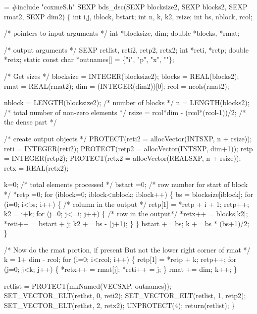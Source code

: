 \documentclass{article}
\begin{document}
\begin{nwchunk}
=
 #include "coxmeS.h"
 SEXP bds_dsc(SEXP blocksize2,  SEXP blocks2,  SEXP rmat2,
              SEXP dim2) \{
     int i,j, iblock, bstart;
     int n, k, k2, rsize;
     int bs, nblock, rcol;
     
     /* pointers to input arguments */
     int *blocksize, dim;
     double *blocks, *rmat;
     
     /* output arguments */
     SEXP retlist, reti2, retp2, retx2;
     int *reti, *retp;
     double *retx;
     static const char *outnames[] = \{"i", "p", "x", ""\};
     
     /* Get sizes */
     blocksize = INTEGER(blocksize2);
     blocks = REAL(blocks2);
     rmat =  REAL(rmat2);
     dim = (INTEGER(dim2))[0];
     rcol = ncols(rmat2);
     
     nblock = LENGTH(blocksize2);  /* number of blocks */
     n = LENGTH(blocks2);          /* total number of non-zero elements */
     rsize = rcol*dim - (rcol*(rcol-1))/2;  /* the dense part */
  
     /* create output objects */
     PROTECT(reti2 = allocVector(INTSXP, n + rsize));
     reti = INTEGER(reti2);
     PROTECT(retp2 = allocVector(INTSXP, dim+1));
     retp = INTEGER(retp2);
     PROTECT(retx2 = allocVector(REALSXP, n + rsize));
     retx = REAL(retx2);
     
     k=0;  /* total elements processed */
     bstart =0;  /* row number for start of block */
     *retp =0;
     for (iblock=0; iblock<nblock; iblock++) \{
         bs = blocksize[iblock];
         for (i=0; i<bs; i++) \{   /* column in the output */
             retp[1] = *retp + i + 1; retp++;
             k2 = i+k;                        
             for (j=0; j<=i; j++) \{ /* row in the output*/
                  *retx++ = blocks[k2];
                 *reti++ = bstart + j;
                 k2 += bs - (j+1);
                 \}
             \}
         bstart += bs;
         k += bs * (bs+1)/2;
         \}
     
     /* Now do the rmat portion, if present 
        But not the lower right corner of rmat
     */
     k = 1+ dim - rcol;
     for (i=0; i<rcol; i++) \{
         retp[1] = *retp + k; retp++;
         for (j=0; j<k; j++) \{
             *retx++ = rmat[j];
             *reti++ = j;
             \}
         rmat += dim;
         k++;
         \}
                     
     retlist = PROTECT(mkNamed(VECSXP, outnames));
     SET_VECTOR_ELT(retlist, 0, reti2);
     SET_VECTOR_ELT(retlist, 1, retp2);
     SET_VECTOR_ELT(retlist, 2, retx2);
     UNPROTECT(4);
     return(retlist);
     \}
\end{nwchunk}
\end{document}
